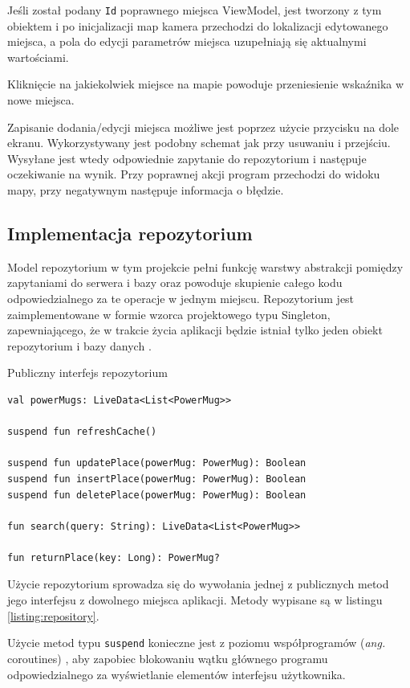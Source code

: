 \documentclass[polish,polish,a4paper,12pt]{article}
\begin{document}
	Jeśli został podany \texttt{Id} poprawnego miejsca ViewModel, jest tworzony z tym obiektem i po inicjalizacji map kamera przechodzi do lokalizacji edytowanego miejsca, a pola do edycji parametrów miejsca uzupełniają się aktualnymi wartościami.

	Kliknięcie na jakiekolwiek miejsce na mapie powoduje przeniesienie wskaźnika w nowe miejsca.

	Zapisanie dodania/edycji miejsca możliwe jest poprzez użycie przycisku na dole ekranu. Wykorzystywany jest podobny schemat jak przy usuwaniu i przejściu. Wysyłane jest wtedy odpowiednie zapytanie do repozytorium i następuje oczekiwanie na wynik. Przy poprawnej akcji program przechodzi do widoku mapy, przy negatywnym następuje informacja o błędzie.

	\subsection{Implementacja repozytorium}

	Model repozytorium w tym projekcie pełni funkcję warstwy abstrakcji pomiędzy zapytaniami do serwera i bazy oraz powoduje skupienie całego kodu odpowiedzialnego za te operacje w jednym miejscu. Repozytorium jest zaimplementowane w formie wzorca projektowego typu Singleton, zapewniającego, że w trakcie życia aplikacji będzie istniał tylko jeden obiekt repozytorium i bazy danych \cite{singletonwiki}.

	\begin{listing}[H]
		\caption{Publiczny interfejs repozytorium}
		\begin{verbatim}
val powerMugs: LiveData<List<PowerMug>>

suspend fun refreshCache()

suspend fun updatePlace(powerMug: PowerMug): Boolean
suspend fun insertPlace(powerMug: PowerMug): Boolean
suspend fun deletePlace(powerMug: PowerMug): Boolean

fun search(query: String): LiveData<List<PowerMug>>

fun returnPlace(key: Long): PowerMug?
		\end{verbatim}
		\label{listing:repository}
	\end{listing}

	Użycie repozytorium sprowadza się do wywołania jednej z publicznych metod jego interfejsu z dowolnego miejsca aplikacji. Metody wypisane są w listingu \ref{listing:repository}.

	Użycie metod typu \texttt{suspend} konieczne jest z poziomu współprogramów (\textit{ang.} coroutines) \cite{kotlindocs}, aby zapobiec blokowaniu wątku głównego programu odpowiedzialnego za wyświetlanie elementów interfejsu użytkownika.
\end{document}
